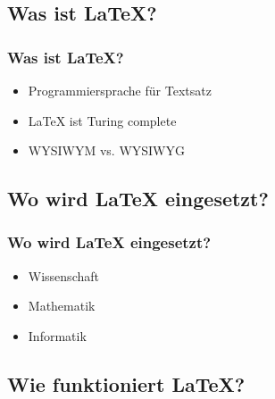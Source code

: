 \documentclass[aspectratio=169]{beamer}
\begin{document}

\subsection{Was ist LaTeX?}
\begin{frame}
\frametitle{Was ist LaTeX?}

\begin{itemize}
\item Programmiersprache für Textsatz
\item LaTeX ist Turing complete
\item WYSIWYM vs. WYSIWYG
\end{itemize}

\end{frame}


\subsection{Wo wird LaTeX eingesetzt?}

\begin{frame}
\frametitle{Wo wird LaTeX eingesetzt?}

\begin{itemize}
\item Wissenschaft
\item Mathematik
\item Informatik
\end{itemize}

\end{frame}


\subsection{Wie funktioniert LaTeX?}
\end{document}
